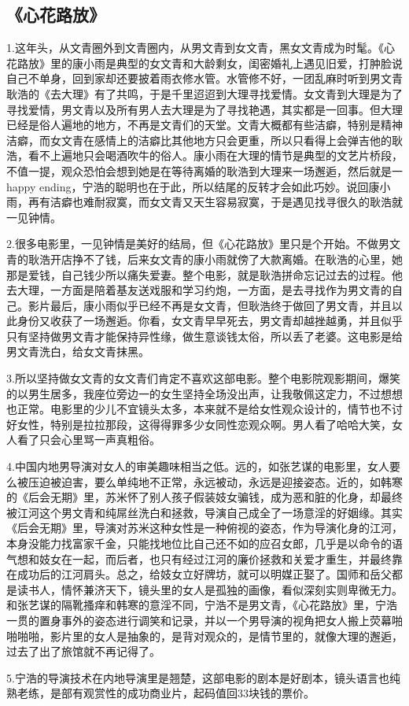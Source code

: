 \subsection{《心花路放》}
1.这年头，从文青圈外到文青圈内，从男文青到女文青，黑女文青成为时髦。《心花路放》里的康小雨是典型的女文青和大龄剩女，闺密婚礼上遇见旧爱，打肿脸说自己不单身，回到家却还要披着雨衣修水管。水管修不好，一团乱麻时听到男文青耿浩的《去大理》有了共鸣，于是千里迢迢到大理寻找爱情。女文青到大理是为了寻找爱情，男文青以及所有男人去大理是为了寻找艳遇，其实都是一回事。但大理已经是俗人遍地的地方，不再是文青们的天堂。文青大概都有些洁癖，特别是精神洁癖，而女文青在感情上的洁癖比其他地方只会更重，所以只看得上会弹吉他的耿浩，看不上遍地只会喝酒吹牛的俗人。康小雨在大理的情节是典型的文艺片桥段，不值一提，观众恐怕会想到她是在等待离婚的耿浩到大理来一场邂逅，然后就是一happy ending，宁浩的聪明也在于此，所以结尾的反转才会如此巧妙。说回康小雨，再有洁癖也难耐寂寞，而女文青又天生容易寂寞，于是遇见找寻很久的耿浩就一见钟情。

2.很多电影里，一见钟情是美好的结局，但《心花路放》里只是个开始。不做男文青的耿浩开店挣不了钱，后来女文青的康小雨就傍了大款离婚。在耿浩的心里，她那是爱钱，自己钱少所以痛失爱妻。整个电影，就是耿浩拼命忘记过去的过程。他去大理，一方面是陪着基友送戏服和学习约炮，一方面，是去寻找作为男文青的自己。影片最后，康小雨似乎已经不再是女文青，但耿浩终于做回了男文青，并且以此身份又收获了一场邂逅。你看，女文青早早死去，男文青却越挫越勇，并且似乎只有坚持做男文青才能保持异性缘，做生意谈钱太俗，所以丢了老婆。这电影是给男文青洗白，给女文青抹黑。

3.所以坚持做女文青的女文青们肯定不喜欢这部电影。整个电影院观影期间，爆笑的以男生居多，我座位旁边一的女生坚持全场没出声，让我敬佩这定力，不过想想也正常。电影里的少儿不宜镜头太多，本来就不是给女性观众设计的，情节也不讨好女性，特别是拉拉那段，这得得罪多少女同性恋观众啊。男人看了哈哈大笑，女人看了只会心里骂一声真粗俗。

4.中国内地男导演对女人的审美趣味相当之低。远的，如张艺谋的电影里，女人要么被压迫被迫害，要么单纯地不正常，永远被动，永远是迎接姿态。近的，如韩寒的《后会无期》里，苏米怀了别人孩子假装妓女骗钱，成为恶和脏的化身，却最终被江河这个男文青和纯屌丝洗白和拯救，导演自己成全了一场意淫的好姻缘。其实《后会无期》里，导演对苏米这种女性是一种俯视的姿态，作为导演化身的江河，本身没能力找富家千金，只能找地位比自己还不如的应召女郎，几乎是以命令的语气想和妓女在一起，而后者，也只有经过江河的廉价拯救和关爱才重生，并最终靠在成功后的江河肩头。总之，给妓女立好牌坊，就可以明媒正娶了。国师和岳父都是读书人，情怀兼济天下，镜头里的女人是孤独的画像，看似深刻实则卑微无力。和张艺谋的隔靴搔痒和韩寒的意淫不同，宁浩不是男文青，《心花路放》里，宁浩一贯的置身事外的姿态进行调笑和记录，并以一个男导演的视角把女人搬上荧幕啪啪啪啪，影片里的女人是抽象的，是背对观众的，是情节里的，就像大理的邂逅，过去了出了旅馆就不再记得了。

5.宁浩的导演技术在内地导演里是翘楚，这部电影的剧本是好剧本，镜头语言也纯熟老练，是部有观赏性的成功商业片，起码值回33块钱的票价。